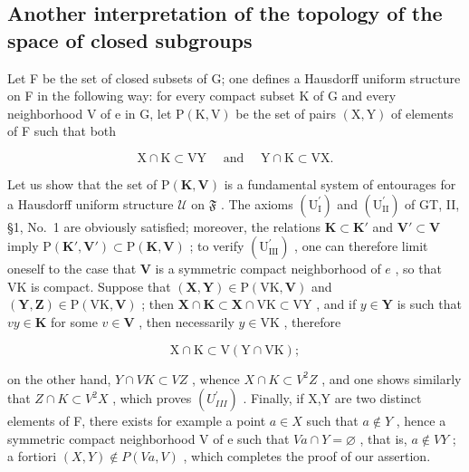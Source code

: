 \subsection{Another interpretation of the topology of the space of closed subgroups}

Let F be the set of closed subsets of G; one defines a Hausdorff uniform structure on F in the following way: for every compact subset K of G and every neighborhood V of e in G, let \(\mathrm{P}(\mathrm{K},\mathrm{V})\) be the set of pairs \((\mathrm{X},\mathrm{Y})\) of elements of F such that both

\[
\mathrm{X} \cap \mathrm{K} \subset \mathrm{VY} \quad \text { and } \quad \mathrm{Y} \cap \mathrm{K} \subset \mathrm{VX}.\tag{9}
\]

Let us show that the set of \(\mathrm{P}(\mathbf{K},\mathbf{V})\) is a fundamental system of entourages for a Hausdorff uniform structure \(\mathcal{U}\) on \(\mathfrak{F}\) . The axioms \((\mathrm{U}_{\mathrm{I}}^{\prime})\) and \((\mathrm{U}_{\mathrm{II}}^{\prime})\) of GT, II, §1, No.~1 are obviously satisfied; moreover, the relations \(\mathbf{K} \subset \mathbf{K}'\) and \(\mathbf{V}' \subset \mathbf{V}\) imply \(\mathrm{P}(\mathbf{K}',\mathbf{V}') \subset \mathrm{P}(\mathbf{K},\mathbf{V})\) ; to verify \((\mathrm{U}_{\mathrm{III}}^{\prime})\) , one can therefore limit oneself to the case that \(\mathbf{V}\) is a symmetric compact neighborhood of \(e\) , so that VK is compact. Suppose that \((\mathbf{X},\mathbf{Y}) \in \mathrm{P}(\mathrm{VK},\mathbf{V})\) and \((\mathbf{Y},\mathbf{Z}) \in \mathrm{P}(\mathrm{VK},\mathbf{V})\) ; then \(\mathbf{X} \cap \mathbf{K} \subset \mathbf{X} \cap \mathrm{VK} \subset \mathrm{VY}\) , and if \(y \in \mathbf{Y}\) is such that \(vy \in \mathbf{K}\) for some \(v \in \mathbf{V}\) , then necessarily \(y \in \mathrm{VK}\) , therefore

\[
\mathrm{X} \cap \mathrm{K} \subset \mathrm{V} (\mathrm{Y} \cap \mathrm{VK});
\]

on the other hand, \(Y \cap VK \subset VZ\) , whence \(X \cap K \subset V^{2}Z\) , and one shows similarly that \(Z \cap K \subset V^{2}X\) , which proves \((U_{III}^{\prime})\) . Finally, if X,Y are two distinct elements of F, there exists for example a point \(a \in X\) such that \(a \notin Y\) , hence a symmetric compact neighborhood V of e such that \(Va \cap Y = \varnothing\) , that is, \(a \notin VY\) ; a fortiori \((X,Y) \notin P(Va,V)\) , which completes the proof of our assertion.

